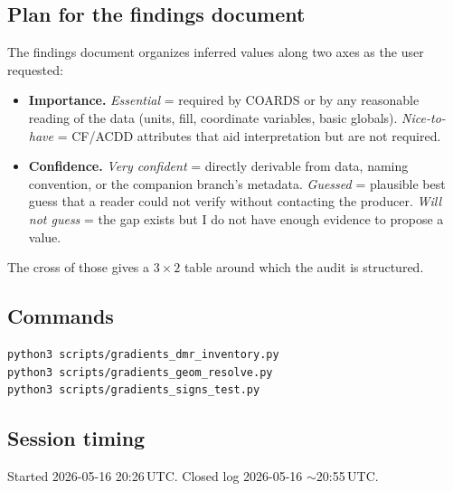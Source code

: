 \documentclass[11pt]{article}
\begin{document}
\subsection{Plan for the findings document}

The findings document organizes inferred values along two axes
as the user requested:
\begin{itemize}
  \item \textbf{Importance.} \emph{Essential} = required by COARDS
    or by any reasonable reading of the data (units, fill,
    coordinate variables, basic globals). \emph{Nice-to-have} =
    CF/ACDD attributes that aid interpretation but are not
    required.
  \item \textbf{Confidence.} \emph{Very confident} = directly
    derivable from data, naming convention, or the companion
    branch's metadata. \emph{Guessed} = plausible best guess that
    a reader could not verify without contacting the producer.
    \emph{Will not guess} = the gap exists but I do not have
    enough evidence to propose a value.
\end{itemize}

The cross of those gives a $3 \times 2$ table around which the
audit is structured.

\subsection{Commands}

\begin{lstlisting}
python3 scripts/gradients_dmr_inventory.py
python3 scripts/gradients_geom_resolve.py
python3 scripts/gradients_signs_test.py
\end{lstlisting}

\subsection{Session timing}

Started 2026-05-16 20:26\,UTC. Closed log 2026-05-16
$\sim$20:55\,UTC.
\end{document}
